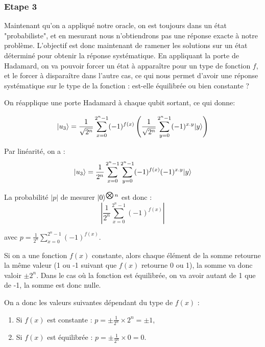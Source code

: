 \documentclass[12pt,a4paper]{article}
\DeclarePairedDelimiter\ket{\lvert}{\rangle}
\begin{document}
\subsubsection{Etape 3}

Maintenant qu'on a appliqué notre oracle, on est toujours dans un état
"probabiliste", et en mesurant nous n'obtiendrons pas une réponse
exacte à notre problème. L'objectif est donc maintenant de ramener les
solutions sur un état déterminé pour obtenir la réponse
systématique. En appliquant la porte de Hadamard, on va pouvoir forcer
un état à apparaître pour un type de fonction $f$, et le forcer à
disparaître dans l'autre cas, ce qui nous permet d'avoir une réponse
systématique sur le type de la fonction : est-elle équilibrée ou bien constante ?

On réapplique une porte Hadamard à chaque qubit sortant, ce qui donne:

\[ \ket{u_3} = \frac{1}{\sqrt{2^{n}}}
\displaystyle\sum_{x=0}^{2^n-1} (-1)^{f(x)} \left( \frac{1}{\sqrt{2^{n}}} \displaystyle\sum_{y=0}^{2^n-1} (-1)^{x.y}\ket{y} \right) \]

Par linéarité, on a :
\begin{equation}
  \label{eq:1}
  \ket{u_3} = \frac{1}{2^{n}}
  \displaystyle\sum_{x=0}^{2^n-1} \displaystyle\sum_{y=0}^{2^n-1}(-1)^{f(x)} (-1)^{x.y}\ket{y}  
\end{equation}

La probabilité $|p|$ de mesurer $\ket{0}^{\bigotimes n}$ est donc : 
\begin{equation}
  \label{eq:2}
  |\frac{1}{2^{n}}\displaystyle\sum_{x=0}^{2^n-1}(-1)^{f(x)}|
\end{equation}

avec $p = \frac{1}{2^{n}}\displaystyle\sum_{x=0}^{2^n-1}(-1)^{f(x)}$.

Si on a une fonction $f(x)$ constante, alors chaque élément de la
somme retourne la même valeur (1 ou -1 suivant que $f(x)$ retourne 0
ou 1), la somme va donc valoir $\pm 2^{n}$. Dans le cas où la fonction
est équilibrée, on va avoir autant de 1 que de -1, la somme est donc
nulle.

On a donc les valeurs suivantes dépendant du type de $f(x)$ :
\begin{enumerate}
  \item Si $f(x)$ est constante :  $p = \pm \frac{1}{2^n} \times 2^{n} = \pm 1$,
  \item Si $f(x)$ est équilibrée : $p = \pm \frac{1}{2^n} \times 0 = 0$.
\end{enumerate}
\end{document}
